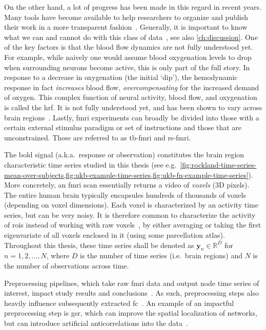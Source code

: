 On the other hand, a lot of progress has been made in this regard in recent years.
Many tools have become available to help researchers to organize and publish their work in a more transparent fashion~\parencite{Marcus2011, Kumar2022, Niso2022}.
Generally, it is important to know what we can and cannot do with this class of data~\parencite{Logothetis2008}, see also \cref{ch:discussion}.
%
One of the key factors is that the blood flow dynamics are not fully understood yet.
For example, while naively one would assume blood oxygenation levels to drop when surrounding neurons become active, this is only part of the full story.
In response to a decrease in oxygenation (the initial `dip'), the hemodynamic response in fact \emph{increases} blood flow, \emph{overcompensating} for the increased demand of oxygen.
This complex function of neural activity, blood flow, and oxygenation is called the \gls{hrf}.
It is not fully understood yet, and has been shown to vary across brain regions~\parencite{Handwerker2004}.
%
Lastly, \gls{fmri} experiments can broadly be divided into those with a certain external stimulus paradigm or set of instructions and those that are unconstrained.
These are referred to as \gls{tb-fmri} and \gls{rs-fmri}.

The \gls{bold} signal (a.k.a.~response or observation) constitutes the brain region characteristic time series studied in this thesis (see e.g.~\cref{fig:rockland-time-series-mean-over-subjects,fig:ukb-example-time-series,fig:ukb-fn-example-time-series}).
More concretely, an \gls{fmri} scan essentially returns a video of \emph{voxels} (3D pixels).
The entire human brain typically encapsules hundreds of thousands of voxels (depending on voxel dimensions).
Each voxel is characterized by an activity time series, but can be very noisy.
It is therefore common to characterize the activity of \glspl{roi} instead of working with raw voxels~\parencite{Korhonen2017}, by either averaging or taking the first eigenvariate of all voxels enclosed in it (using some parcellation atlas).
Throughout this thesis, these time series shall be denoted as $\mathbf{y}_n \in \mathbb{R}^D$ for $n = 1, 2, \ldots , N$, where $D$ is the number of time series (i.e.~brain regions) and $N$ is the number of observations across time.

Preprocessing pipelines, which take raw \gls{fmri} data and output node time series of interest, impact study results and conclusions~\parencite{Caballero-Gaudes2017}.
As such, preprocessing steps also heavily influence subsequently extracted \gls{fc}~\parencite{Aquino2022}.
An example of an impactful preprocessing step is \gls{gsr}, which can improve the spatial localization of networks, but can introduce artificial anticorrelations into the data~\parencite{Murphy2009}.

